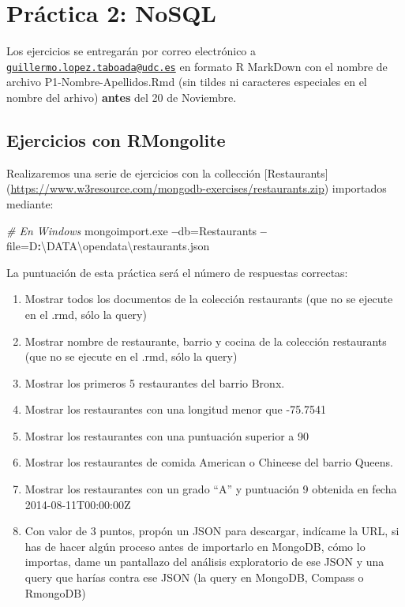 \documentclass[]{book}
\newenvironment{Shaded}{\begin{snugshade}}{\end{snugshade}}
\newcommand{\CommentTok}[1]{\textcolor[rgb]{0.56,0.35,0.01}{\textit{#1}}}
\newcommand{\OperatorTok}[1]{\textcolor[rgb]{0.81,0.36,0.00}{\textbf{#1}}}
\newcommand{\NormalTok}[1]{#1}
\begin{document}
\section{Práctica 2: NoSQL}\label{pruxe1ctica-2-nosql}

Los ejercicios se entregarán por correo electrónico a
\href{mailto:guillermo.lopez.taboada@udc.es}{\nolinkurl{guillermo.lopez.taboada@udc.es}}
en formato R MarkDown con el nombre de archivo P1-Nombre-Apellidos.Rmd
(sin tildes ni caracteres especiales en el nombre del arhivo)
\textbf{antes} del 20 de Noviembre.

\subsection{Ejercicios con RMongolite}\label{ejercicios-con-rmongolite}

Realizaremos una serie de ejercicios con la collección {[}Restaurants{]}
(\url{https://www.w3resource.com/mongodb-exercises/restaurants.zip})
importados mediante:

\begin{Shaded}
\begin{Highlighting}[]
\CommentTok{# En Windows}
\NormalTok{mongoimport.exe }\OperatorTok{--}\NormalTok{db=Restaurants }\OperatorTok{--}\NormalTok{file=D}\OperatorTok{:}\NormalTok{\textbackslash{}DATA\textbackslash{}opendata\textbackslash{}restaurants.json}
\end{Highlighting}
\end{Shaded}

La puntuación de esta práctica será el número de respuestas correctas:

\begin{enumerate}
\def\labelenumi{\arabic{enumi}.}
\item
  Mostrar todos los documentos de la colección restaurants (que no se
  ejecute en el .rmd, sólo la query)
\item
  Mostrar nombre de restaurante, barrio y cocina de la colección
  restaurants (que no se ejecute en el .rmd, sólo la query)
\item
  Mostrar los primeros 5 restaurantes del barrio Bronx.
\item
  Mostrar los restaurantes con una longitud menor que -75.7541
\item
  Mostrar los restaurantes con una puntuación superior a 90
\item
  Mostrar los restaurantes de comida American o Chineese del barrio
  Queens.
\item
  Mostrar los restaurantes con un grado ``A'' y puntuación 9 obtenida en
  fecha 2014-08-11T00:00:00Z
\item
  Con valor de 3 puntos, propón un JSON para descargar, indícame la URL,
  si has de hacer algún proceso antes de importarlo en MongoDB, cómo lo
  importas, dame un pantallazo del análisis exploratorio de ese JSON y
  una query que harías contra ese JSON (la query en MongoDB, Compass o
  RmongoDB)
\end{enumerate}
\end{document}

